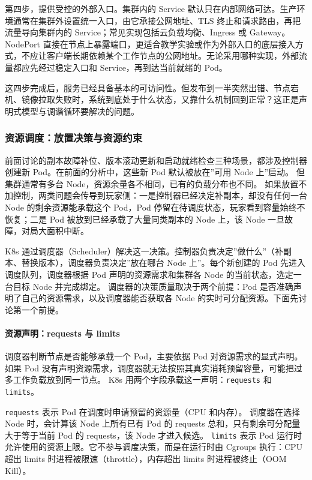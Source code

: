 第四步，提供受控的外部入口。集群内的 Service 默认只在内部网络可达。生产环境通常在集群外设置统一入口，由它承接公网地址、TLS 终止和请求路由，再把流量导向集群内的 Service；常见实现包括云负载均衡、Ingress 或 Gateway。NodePort 直接在节点上暴露端口，更适合教学实验或作为外部入口的底层接入方式，不应让客户端长期依赖某个工作节点的公网地址。无论采用哪种实现，外部流量都应先经过稳定入口和 Service，再到达当前就绪的 Pod。

这四步完成后，服务已经具备基本的可访问性。但发布到一半突然出错、节点宕机、镜像拉取失败时，系统到底处于什么状态，又靠什么机制回到正常？这正是声明式模型与调谐循环要解决的问题。

\subsubsection{资源调度：放置决策与资源约束}

前面讨论的副本故障补位、版本滚动更新和启动就绪检查三种场景，都涉及控制器创建新 Pod。在前面的分析中，这些新 Pod 默认被放在”可用 Node 上”启动。
但集群通常有多台 Node，资源余量各不相同，已有的负载分布也不同。
如果放置不加控制，两类问题会传导到玩家侧：一是控制器已经决定补副本，却没有任何一台 Node 的剩余资源能承载这个 Pod，Pod 停留在待调度状态，玩家看到容量始终不恢复；二是 Pod 被放到已经承载了大量同类副本的 Node 上，该 Node 一旦故障，对局大面积中断。

K8s 通过调度器（Scheduler）解决这一决策。控制器负责决定”做什么”（补副本、替换版本），调度器负责决定”放在哪台 Node 上”。每个新创建的 Pod 先进入调度队列，调度器根据 Pod 声明的资源需求和集群各 Node 的当前状态，选定一台目标 Node 并完成绑定。
调度器的决策质量取决于两个前提：Pod 是否准确声明了自己的资源需求，以及调度器能否获取各 Node 的实时可分配资源。下面先讨论第一个前提。

\paragraph{资源声明：requests 与 limits}

调度器判断节点是否能够承载一个 Pod，主要依据 Pod 对资源需求的显式声明。如果 Pod 没有声明资源需求，调度器就无法按照其真实消耗预留容量，可能把过多工作负载放到同一节点。
K8s 用两个字段承载这一声明：\texttt{requests} 和 \texttt{limits}。

\texttt{requests} 表示 Pod 在调度时申请预留的资源量（CPU 和内存）。
调度器在选择 Node 时，会计算该 Node 上所有已有 Pod 的 requests 总和，只有剩余可分配量大于等于当前 Pod 的 requests，该 Node 才进入候选。
\texttt{limits} 表示 Pod 运行时允许使用的资源上限。它不参与调度决策，而是在运行时由 Cgroups 执行：CPU 超出 limits 时进程被限速（throttle），内存超出 limits 时进程被终止（OOM Kill）。

